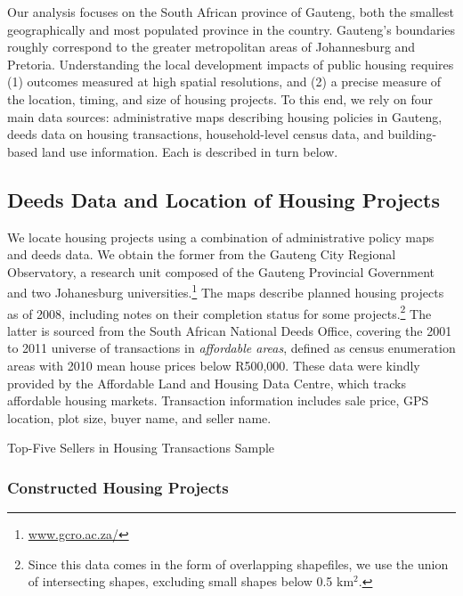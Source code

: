 \documentclass[12pt]{article}
\begin{document}
Our analysis focuses on the South African province of Gauteng, both the smallest geographically and most populated province in the country. Gauteng's boundaries roughly correspond to the greater metropolitan areas of Johannesburg and Pretoria. Understanding the local development impacts of public housing requires (1) outcomes measured at high spatial resolutions, and (2) a precise measure of the location, timing, and size of housing projects.  To this end, we rely on four main data sources: administrative maps describing housing policies in Gauteng, deeds data on housing transactions, household-level census data, and building-based land use information. Each is described in turn below.

\subsection{Deeds Data and Location of Housing Projects}

 We locate housing projects using a combination of administrative policy maps and deeds data. We obtain the former from the Gauteng City Regional Observatory, a research unit composed of the Gauteng Provincial Government and two Johanesburg universities.\footnote{\href{url}{www.gcro.ac.za/}} The maps describe planned housing projects as of 2008, including notes on their completion status for some projects.\footnote{Since this data comes in the form of overlapping shapefiles, we use the union of intersecting shapes, excluding small shapes below 0.5 km$^2$.} The latter is sourced from the South African National Deeds Office, covering the 2001 to 2011 universe of transactions in {\it affordable areas}, defined as census enumeration areas with 2010 mean house prices below R500,000. These data were kindly provided by the Affordable Land and Housing Data Centre, which tracks affordable housing markets. Transaction information includes sale price, GPS location, plot size, buyer name, and seller name.

\begin{table}[h!]
\vspace{4mm}
\caption{Top-Five Sellers in Housing Transactions Sample}\label{table:topfivesellers}
\vspace{-2mm}
\centering

\vspace{-4mm}
\end{table}

 \subsubsection*{Constructed Housing Projects}
\end{document}
